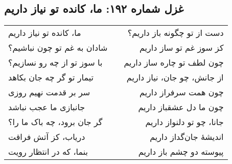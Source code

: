 \begin{center}
\section*{غزل شماره ۱۹۲: ما، کانده تو نیاز داریم}
\label{sec:192}
\begin{longtable}{l p{0.5cm} r}
ما، کانده تو نیاز داریم
&&
دست از تو چگونه باز داریم؟
\\
شادان به غم تو چون نباشیم؟
&&
کز سوز غم تو ساز داریم
\\
با سوز تو از چه رو نسازیم؟
&&
چون لطف تو چاره ساز داریم
\\
تیمار تو گر چه جان بکاهد
&&
از جانش، چو جان، نیاز داریم
\\
سر بر قدمت نهیم روزی
&&
چون همت سرفراز داریم
\\
جانبازی ما عجب نباشد
&&
چون ما دل عشقباز داریم
\\
گر جان برود، چه باک ما را؟
&&
جانا، چو تو دلنواز داریم
\\
دریاب، کز آتش فراقت
&&
اندیشهٔ جان‌گداز داریم
\\
بنما، که در انتظار رویت
&&
پیوسته دو چشم باز داریم
\\
\end{longtable}
\end{center}
